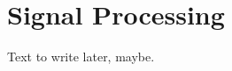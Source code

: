 \documentclass[../main.tex]{subfiles}
\begin{document}
\chapter{Signal Processing}
\label{signal}

Text to write later, maybe.
\end{document}
